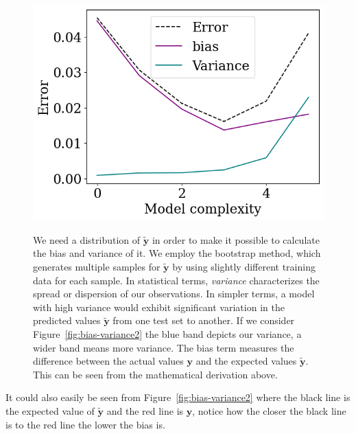 \documentclass[twoside,11pt]{report}
\begin{document}
\begin{figure}[!h]
\begin{minipage}[!t]{.48\linewidth}
    \begin{center}
        \includegraphics[width=1.0\textwidth]{../runsAndAdditions/bias-variance1.png}
        \caption{}\label{fig:bias-variance1}
    \end{center}
\end{minipage}
\hspace{2mm}
\begin{minipage}[!t]{.45\linewidth}
We need a distribution of $\mathbf{\tilde{y}}$ in order to make it possible to calculate the bias and variance of it.
We employ the bootstrap method, which generates 
multiple samples for $\mathbf{\tilde{y}}$ by using slightly different training data for each sample.
In statistical terms, \emph{variance} characterizes the spread or dispersion of our observations.
In simpler terms, a model with high variance would exhibit significant variation in the predicted values 
$\mathbf{\tilde{y}}$ from one test set to another.
If we consider Figure~\ref{fig:bias-variance2} the blue band depicts our variance, a wider band means more variance. 
The bias term measures the difference between the actual values $\mathbf{y}$ and the
expected values $\mathbf{\tilde{y}}$. This can be seen from the mathematical derivation above.
\end{minipage}
\end{figure}
It could also easily be seen from Figure~\ref{fig:bias-variance2} where the black line is the expected value of $\mathbf{\tilde{y}}$ and 
the red line is $\mathbf{y}$, notice how the closer the black line is to the red line the lower the bias is.
\end{document}

